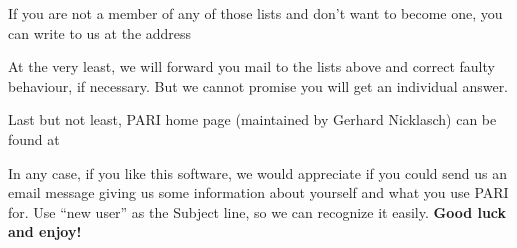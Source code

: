 \centerline{}

If you are not a member of any of those lists and don't want to become one,
you can write to us at the address

\centerline{}

At the very least, we will forward you mail to the lists above and correct
faulty behaviour, if necessary. But we cannot promise you will get an
individual answer.

Last but not least, PARI home page (maintained by Gerhard Nicklasch) can be
found at

\centerline{\wwwsite}

   In any case, if you like this software, we would appreciate if you could
send us an email message giving us some information about yourself and what
you use PARI for. Use ``new user'' as the Subject line, so we can recognize
it easily.
\medskip
{\bf Good luck and enjoy!}
\vfill\eject
